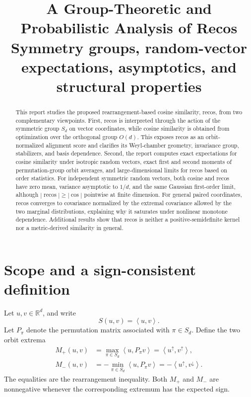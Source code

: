 \documentclass[11pt,a4paper]{article}
\title{\textbf{A Group-Theoretic and Probabilistic Analysis of Recos}\\
\large Symmetry groups, random-vector expectations, asymptotics, and structural properties}
\author{}
\date{}
\newcommand{\R}{\mathbb{R}}
\newcommand{\Sd}{S_d}
\newcommand{\ip}[2]{\left\langle #1,#2\right\rangle}
\newcommand{\recos}{\operatorname{recos}}
\newcommand{\cosim}{\operatorname{cos}}
\begin{document}
\maketitle

\begin{abstract}
This report studies the proposed rearrangement-based cosine similarity, recos, from two complementary viewpoints. First, recos is interpreted through the action of the symmetric group $S_d$ on vector coordinates, while cosine similarity is obtained from optimization over the orthogonal group $O(d)$. This exposes recos as an orbit-normalized alignment score and clarifies its Weyl-chamber geometry, invariance group, stabilizers, and basis dependence. Second, the report computes exact expectations for cosine similarity under isotropic random vectors, exact first and second moments of permutation-group orbit averages, and large-dimensional limits for recos based on order statistics. For independent symmetric random vectors, both cosine and recos have zero mean, variance asymptotic to $1/d$, and the same Gaussian first-order limit, although $|\recos|\geq |\cosim|$ pointwise at finite dimension. For general paired coordinates, recos converges to covariance normalized by the extremal covariance allowed by the two marginal distributions, explaining why it saturates under nonlinear monotone dependence. Additional results show that recos is neither a positive-semidefinite kernel nor a metric-derived similarity in general.
\end{abstract}

\tableofcontents

\section{Scope and a sign-consistent definition}

Let $u,v\in\R^d$, and write
\begin{equation}
    S(u,v)=\ip{u}{v}.
\end{equation}
Let $P_\pi$ denote the permutation matrix associated with $\pi\in\Sd$. Define the two orbit extrema
\begin{align}
    M_+(u,v)
    &=\max_{\pi\in\Sd}\ip{u}{P_\pi v}
      =\ip{u^\uparrow}{v^\uparrow}, \\
    M_-(u,v)
    &=-\min_{\pi\in\Sd}\ip{u}{P_\pi v}
      =-\ip{u^\uparrow}{v^\downarrow}.
\end{align}
The equalities are the rearrangement inequality. Both $M_+$ and $M_-$ are nonnegative whenever the corresponding extremum has the expected sign.
\end{document}
